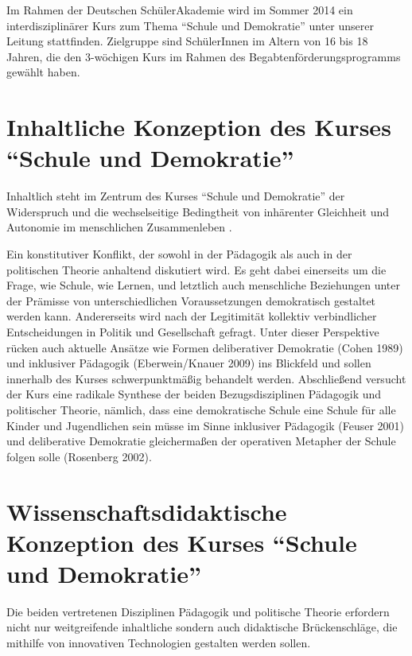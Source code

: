 \documentclass[11pt,a4paper,oneside]{article}
\begin{document}

Im Rahmen der Deutschen SchülerAkademie wird im Sommer 2014 ein interdisziplinärer Kurs zum Thema ``Schule und Demokratie'' unter unserer Leitung stattfinden.
Zielgruppe sind SchülerInnen im Altern von 16 bis 18 Jahren, die den 3-wöchigen Kurs im Rahmen des Begabtenförderungsprogramms gewählt haben.

\section{Inhaltliche Konzeption des Kurses ``Schule und Demokratie''}

Inhaltlich steht im Zentrum des Kurses ``Schule und Demokratie'' der Widerspruch und die wechselseitige Bedingtheit von inhärenter Gleichheit und Autonomie im menschlichen Zusammenleben \cite{Habermas1999a}.

Ein konstitutiver Konflikt, der sowohl in der Pädagogik als auch in der politischen Theorie anhaltend diskutiert wird.
Es geht dabei einerseits um die Frage, wie Schule, wie Lernen, und letztlich auch menschliche Beziehungen unter der Prämisse von unterschiedlichen Voraussetzungen demokratisch gestaltet werden kann.
Andererseits wird nach der Legitimität kollektiv verbindlicher Entscheidungen in Politik und Gesellschaft gefragt.
Unter dieser Perspektive rücken auch aktuelle Ansätze wie Formen deliberativer Demokratie (Cohen 1989) und inklusiver Pädagogik (Eberwein/Knauer 2009) ins Blickfeld und sollen innerhalb des Kurses schwerpunktmäßig behandelt werden.
Abschließend versucht der Kurs eine radikale Synthese der beiden Bezugsdisziplinen Pädagogik und politischer Theorie, nämlich, dass eine demokratische Schule eine Schule für alle Kinder und Jugendlichen sein müsse im Sinne inklusiver Pädagogik (Feuser 2001) und deliberative Demokratie gleichermaßen der operativen Metapher der Schule folgen solle (Rosenberg 2002).

\section{Wissenschaftsdidaktische Konzeption des Kurses ``Schule und Demokratie''}

Die beiden vertretenen Disziplinen Pädagogik und politische Theorie erfordern nicht nur weitgreifende inhaltliche sondern auch didaktische Brückenschläge, die mithilfe von innovativen Technologien gestalten werden sollen.
\end{document}
